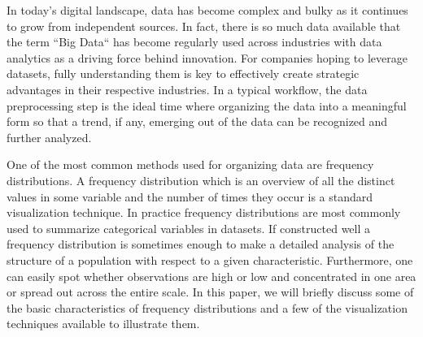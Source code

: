In today's digital landscape, data has become complex and bulky as it continues to 
grow from independent sources. In fact, there is so much data available that the 
term ``Big Data`` has become regularly used across industries with data analytics as a 
driving force behind innovation. For companies hoping to leverage datasets, fully
understanding them is key to effectively create strategic advantages in their respective 
industries. In a typical workflow, the data preprocessing step is the ideal time 
where organizing the data into a meaningful form so that a trend, if any, emerging 
out of the data can be recognized and further analyzed. 

One of the most common methods used for organizing data are frequency distributions.
A frequency distribution which is an overview of all the distinct values in some 
variable and the number of times they occur is a standard visualization technique. 
In practice frequency distributions are most commonly used to summarize categorical 
variables in datasets. If constructed well a frequency distribution is sometimes 
enough to make a detailed analysis of the structure of a population with respect 
to a given characteristic. Furthermore, one can easily spot whether observations 
are high or low and concentrated in one area or spread out across the entire scale. 
In this paper, we will briefly discuss some of the basic characteristics of 
frequency distributions and a few of the visualization techniques available to 
illustrate them.
